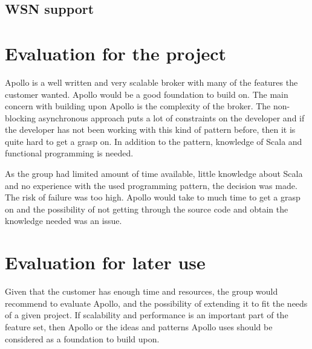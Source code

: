 \subsection{WSN support}

\section{Evaluation for the project}
Apollo is a well written and very scalable broker with many of the features the customer wanted. Apollo would be a good foundation to build on. The main concern with building upon Apollo is the complexity of the broker. The non-blocking asynchronous approach puts a lot of constraints on the developer and if the developer has not been working with this kind of pattern before, then it is quite hard to get a grasp on. In addition to the pattern, knowledge of Scala and functional programming is needed. 

As the group had limited amount of time available, little knowledge about Scala and no experience with the used programming pattern, the decision was made. The risk of failure was too high. Apollo would take to much time to get a grasp on and the possibility of not getting through the source code and obtain the knowledge needed was an issue. 

\section{Evaluation for later use}
Given that the customer has enough time and resources, the group would recommend to evaluate Apollo, and the possibility of extending it to fit the needs of a given project. If scalability and performance is an important part of the feature set, then Apollo or the ideas and patterns Apollo uses should be considered as a foundation to build upon. 

\clearpage
